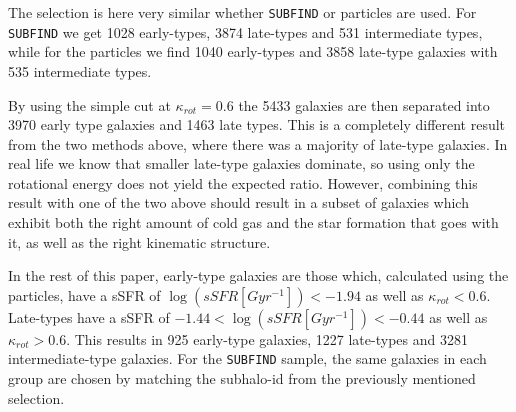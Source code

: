 The selection is here very similar whether \texttt{SUBFIND} or particles are used. For \texttt{SUBFIND} we get 1028 early-types, 3874 late-types and 531 intermediate types, while for the particles we find 1040 early-types and 3858 late-type galaxies with 535 intermediate types.

By using the simple cut at $\kappa_{rot} = 0.6$ the 5433 galaxies are then separated into 3970 early type galaxies and 1463 late types. This is a completely different result from the two methods above, where there was a majority of late-type galaxies. In real life we know that smaller late-type galaxies dominate, so using only the rotational energy does not yield the expected ratio. However, combining this result with one of the two above should result in a subset of galaxies which exhibit both the right amount of cold gas and the star formation that goes with it, as well as the right kinematic structure.

In the rest of this paper, early-type galaxies are those which, calculated using the particles, have a sSFR of $\log (sSFR[Gyr^{-1}]) < -1.94$ as well as $\kappa_{rot} < 0.6$. Late-types have a sSFR of $ -1.44 < \log (sSFR[Gyr^{-1}]) < -0.44$ as well as $\kappa_{rot} > 0.6$. This results in 925 early-type galaxies, 1227 late-types and 3281 intermediate-type galaxies. For the \texttt{SUBFIND} sample, the same galaxies in each group are chosen by matching the subhalo-id from the previously mentioned selection.